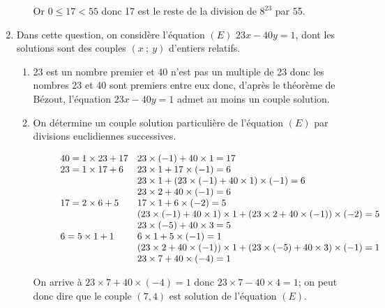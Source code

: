 \documentclass[10pt]{article}
\begin{document}
\begin{enumerate}
\begin{enumerate}
Or $0\leqslant 17 < 55$ donc 17 est le reste de la division de $8^{23}$ par 55.		
		
 	\end{enumerate}
\item  Dans cette question, on considère l'équation $(E)$\: $23 x - 40 y = 1$, dont les solutions sont des couples $(x~;~y)$ d'entiers relatifs.
	\begin{enumerate}
		\item%
23 est un nombre premier et 40 n'est pas un multiple de 23 donc les nombres 23 et 40 sont premiers entre eux donc, d'après le théorème de Bézout, 	l'équation $23x-40y=1$ admet au moins un couple solution.
		
		\item  On détermine un couple solution particulière de l'équation $(E)$ par divisions euclidiennes successives.
		
$\begin{array}{@{\hspace*{1cm}}l l}
40=1\times 23 + 17  & 23\times (-1) + 40 \times 1 = 17\\
23 = 1\times 17 + 6  & 23\times 1 +17 \times (-1) = 6\\
                                    & 23\times 1 + \left (23\times (-1) + 40 \times 1\mathstrut\right )\times (-1) = 6\\
                                    & 23 \times 2 + 40 \times (-1) = 6\\
17 = 2\times 6 + 5   & 17\times 1 + 6 \times (-2) = 5\\
                                   & \left (23\times (-1) + 40 \times 1 \mathstrut\right )\times 1 + \left ( 23 \times 2 + 40 \times (-1) \mathstrut\right ) \times (-2) = 5\\
                                  & 23\times (-5) + 40 \times 3 = 5\\
6 = 5\times 1 + 1    & 6\times 1 + 5\times (-1) = 1\\
                                 & \left ( 23 \times 2 + 40 \times (-1) \mathstrut\right ) \times 1 + \left (23\times (-5) + 40 \times 3\mathstrut \right ) \times (-1) = 1\\
                                 & 23\times 7 + 40\times (-4) = 1\\
\end{array}$

On arrive à $23\times 7 + 40\times (-4) = 1$ donc $23\times 7 - 40\times 4 = 1$; on peut donc dire que le couple $(7,4)$ est solution de l'équation $(E)$.
		

\end{enumerate}
\end{enumerate}
\end{document}
